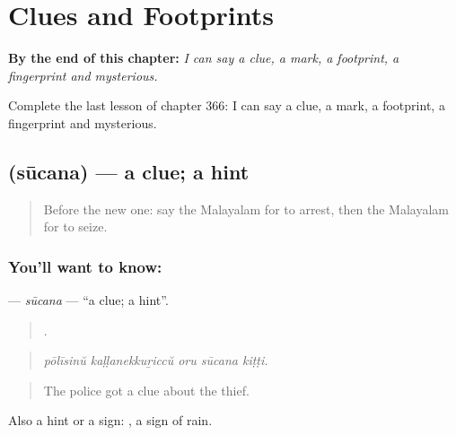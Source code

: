 
\chapter{Clues and Footprints}
\label{ch:ml-clues-and-footprints}

\begin{chapteropening}
\textbf{By the end of this chapter:} \emph{I can say a clue, a mark, a footprint, a fingerprint and mysterious.}

Complete the last lesson of chapter 366: I can say a clue, a mark, a footprint, a fingerprint and mysterious.
\end{chapteropening}

\section[\texorpdfstring{\ml{സൂചന} (sūcana)}{സൂചന (sūcana)}]{ (sūcana) — a clue; a hint}

\label{lesson:ML-C366-sucana}



\begin{quote}
Before the new one: say the Malayalam for to arrest, then the Malayalam for to seize.
\end{quote}

\subsection*{You'll want to know: }
\textbf{} — \emph{sūcana} — \textquotedblleft{}a clue; a hint\textquotedblright{}.

\begin{quote}
    .
\end{quote}

\begin{quote}
\emph{pōlīsinŭ kaḷḷanekkuṟiccŭ oru sūcana kiṭṭi.}
\end{quote}

\begin{quote}
The police got a clue about the thief.
\end{quote}

Also a hint or a sign:  , a sign of rain.

